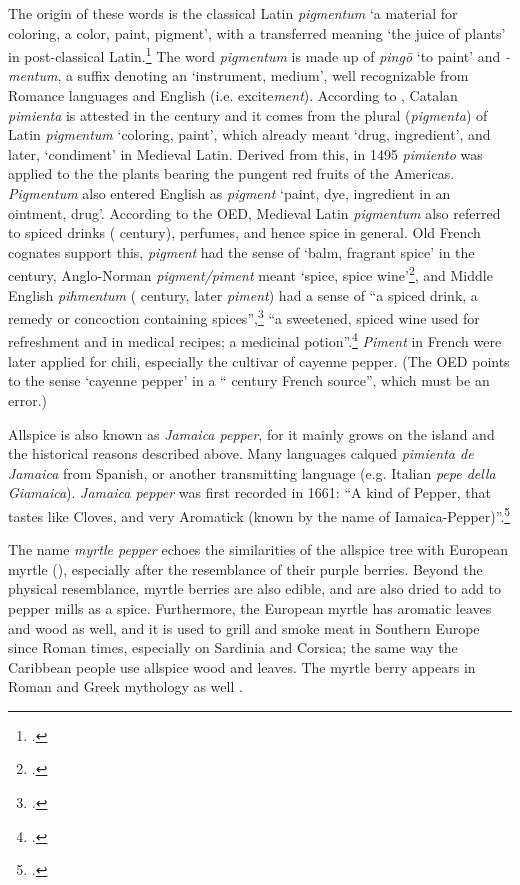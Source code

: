 The origin of these words is the classical Latin \textit{pigmentum} `a material for coloring, a color, paint, pigment', with a transferred meaning `the juice of plants' in post-classical Latin.\footcite[pigmentum ]{lewis_latin_1879} The word \textit{pigmentum} is made up of \textit{pingō} `to paint' and \textit{-mentum}, a suffix denoting an `instrument, medium', well recognizable from Romance languages and English (i.e. excite\textit{ment}).
According to \textcite[459]{corominas_breve_1987}, Catalan \textit{pimienta} is attested in the  century and it comes from the plural (\textit{pigmenta}) of Latin \textit{pigmentum} `coloring, paint', which already meant `drug, ingredient', and later, `condiment' in Medieval Latin. Derived from this, in 1495 \textit{pimiento} was applied to the the plants bearing the pungent red fruits of the Americas. \textit{Pigmentum} also entered English as \textit{pigment} `paint, dye, ingredient in an ointment, drug'. According to the \gls{OED}, Medieval Latin \textit{pigmentum} also referred to spiced drinks ( century), perfumes, and hence spice in general. Old French cognates support this, \textit{pigment} had the sense of `balm, fragrant spice' in the  century, Anglo-Norman \textit{pigment/piment} meant `spice, spice wine'\footcite[pigment]{oed}, and Middle English \textit{pihmentum} ( century, later \textit{piment}) had a sense of ``a spiced drink, a remedy or concoction containing spices'',\footcite[pigment]{oe} ``a sweetened, spiced wine used for refreshment and in medical recipes; a medicinal potion''.\footcite[piment]{med} \textit{Piment} in French were later applied for chili, especially the cultivar of cayenne pepper. (The \gls{OED} points to the sense `cayenne pepper' in a `` century French source'', which must be an error.)


Allspice is also known as \textit{Jamaica pepper}, for it mainly grows on the island and the historical reasons described above. Many languages calqued \textit{pimienta de Jamaica} from Spanish, or another transmitting language (e.g. Italian \textit{pepe della Giamaica}). \textit{Jamaica pepper} was first recorded in 1661: ``A kind of Pepper, that tastes like Cloves, and very Aromatick (known by the name of Iamaica-Pepper)''.\footcite[Jamaica]{oed}

The name \textit{myrtle pepper}  echoes the similarities of the allspice tree with European myrtle (), especially after the resemblance of their purple berries. Beyond the physical resemblance, myrtle berries are also edible, and are also dried to add to pepper mills as a spice. Furthermore, the European myrtle has aromatic leaves and wood as well, and it is used to grill and smoke meat in Southern Europe since Roman times, especially on Sardinia and Corsica; the same way the Caribbean people use allspice wood and leaves. The myrtle berry appears in Roman and Greek mythology as well \autocite[186]{van_wyk_culinary_2014}.

